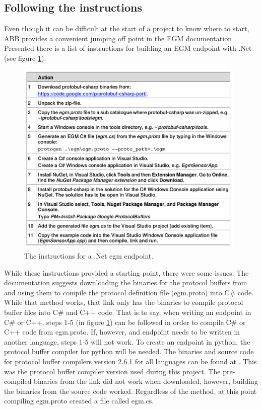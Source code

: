\documentclass{cslthse-msc}
\begin{document}
\subsection{Following the instructions}
\label{sec:Dev:I1:instructions}
Even though it can be difficult at the start of a project to know where to start, ABB provides a convenient jumping off point in the EGM documentation \cite[Sec. 9.3.3]{ABB:controller_software}. Presented there is a list of instructions for building an EGM endpoint with .Net (see figure \ref{fig:egm_endpoint_instructions}). 

\begin{figure}[H]
    \centering
    \includegraphics[width=11cm]{egm_endpoint_instructions.png}
    \caption{The instructions for a .Net egm endpoint.}
    \label{fig:egm_endpoint_instructions}
\end{figure}

While these instructions provided a starting point, there were some issues. The documentation suggests downloading the binaries for the protocol buffers from \cite{jskeet:github} and using them to compile the protocol definition file (egm.proto) into C\# code. While that method works, that link only has the binaries to compile protocol buffer files into C\# and C++ code. That is to say, when writing an endpoint in C\# or C++, steps 1-5 (in figure \ref{fig:egm_endpoint_instructions}) can be followed in order to compile C\# or C++ code from egm.proto. If, however, and endpoint needs to be written in another language, steps 1-5 will not work. To create an endpoint in python, the protocol buffer compiler for python will be needed. The binaries and source code for protocol buffer compilers version 2.6.1 for all languages can be found at \cite{Google:github}. This was the protocol buffer compiler version used during this project. The pre-compiled binaries from the link did not work when downloaded, however, building the binaries from the source code worked. Regardless of the method, at this point compiling egm.proto created a file called egm.cs. 
\end{document}
